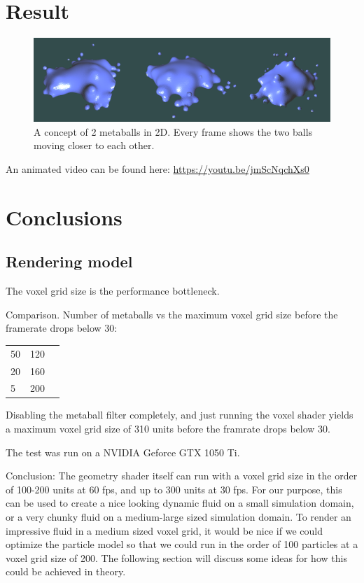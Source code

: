 \documentclass{article}
\begin{document}
    \section{Result}
        \begin{figure}[H]
            \begin{center}
            \includegraphics[width=\linewidth]{img/result-animation.png}
            \caption{A concept of 2 metaballs in 2D. Every frame shows the two balls moving closer to each other.}
            \label{fig:result-animation}
        \end{center}
        \end{figure}

        An animated video can be found here:
        \url{https://youtu.be/jmScNqchXs0}

    \section{Conclusions}
    
        \subsection{Rendering model}
        The voxel grid size is the performance bottleneck.

        Comparison.
        Number of metaballs vs the maximum voxel grid size before the framerate drops below 30:

        \begin{tabular}{ l | c | r }
          50 & 120 \\
          20 & 160 \\
          5 & 200 \\
        \end{tabular}

        Disabling the metaball filter completely, and just running the voxel shader yields a maximum voxel grid size of 310 units before the framrate drops below 30.

        The test was run on a NVIDIA Geforce GTX 1050 Ti.

        Conclusion: The geometry shader itself can run with a voxel grid size in the order of 100-200 units at 60 fps, and up to 300 units at 30 fps.
        For our purpose, this can be used to create a nice looking dynamic fluid on a small simulation domain, or a very chunky fluid on a medium-large sized simulation domain.
        To render an impressive fluid in a medium sized voxel grid, it would be nice if we could optimize the particle model so that we could run in the order of 100 particles at a voxel grid size of 200.
        The following section will discuss some ideas for how this could be achieved in theory.
\end{document}
